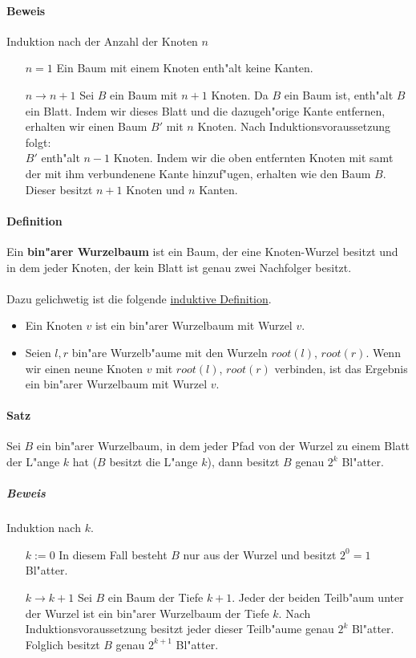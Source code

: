 \paragraph{Beweis} Induktion nach der Anzahl der Knoten $n$
\begin{itemize}
    \item[$n=1$] Ein Baum mit einem Knoten enth"alt keine Kanten.
    \item[$n\rightarrow n+1$] Sei $B$ ein Baum mit $n+1$ Knoten. Da $B$ ein Baum ist, enth"alt $B$ ein Blatt.
                              Indem wir dieses Blatt und die dazugeh"orige Kante entfernen, erhalten wir einen
                              Baum $B'$ mit $n$ Knoten. Nach Induktionsvoraussetzung folgt:\\
                              $B'$ enth"alt $n-1$ Knoten. Indem wir die oben entfernten Knoten mit samt der mit
                              ihm verbundenene Kante hinzuf"ugen, erhalten wie den Baum $B$. Dieser besitzt $n+1$
                              Knoten und $n$ Kanten.
\end{itemize}

\paragraph{Definition} \parskp
Ein \textbf{bin"arer Wurzelbaum} ist ein Baum, der eine Knoten-Wurzel besitzt und in dem jeder Knoten, der
kein Blatt ist genau zwei Nachfolger besitzt.\\
\\
Dazu gelichwetig ist die folgende \underline{induktive Definition}.
\begin{itemize}
    \item Ein Knoten $v$ ist ein bin"arer Wurzelbaum mit Wurzel $v$.
    \item Seien $l,r$ bin"are Wurzelb"aume mit den Wurzeln $root(l)$, $root(r)$. Wenn wir einen neune
          Knoten $v$ mit $root(l)$, $root(r)$ verbinden, ist das Ergebnis ein bin"arer Wurzelbaum mit
          Wurzel $v$.
\end{itemize}

\paragraph{Satz} \parskp
Sei $B$ ein bin"arer Wurzelbaum, in dem jeder Pfad von der Wurzel zu einem Blatt der L"ange $k$ hat
($B$ besitzt die L"ange $k$), dann besitzt $B$ genau $2^k$ Bl"atter. %

\subparagraph{Beweis} Induktion nach $k$.
\begin{itemize}
    \item[$k:=0$] In diesem Fall besteht $B$ nur aus der Wurzel und besitzt $2^0=1$ Bl"atter.
    \item[$k\rightarrow k+1$] Sei $B$ ein Baum der Tiefe $k+1$. Jeder der beiden Teilb"aum unter der Wurzel
                            ist ein bin"arer Wurzelbaum der Tiefe $k$. Nach Induktionsvoraussetzung besitzt
                            jeder dieser Teilb"aume genau $2^k$ Bl"atter. Folglich besitzt $B$ genau
                            $2^{k+1}$ Bl"atter.
\end{itemize}

